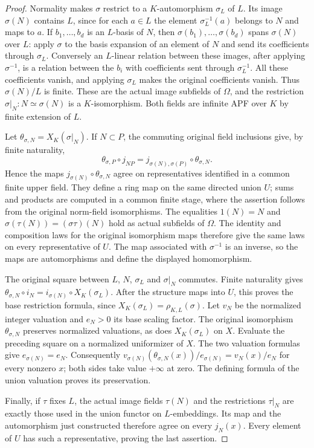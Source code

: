 \begin{proof}
Normality makes $\sigma$ restrict to a $K$-automorphism $\sigma_L$ of
$L$. Its image $\sigma(N)$ contains $L$, since for each $a\in L$
the element $\sigma_L^{-1}(a)$ belongs to $N$ and maps to $a$.
If $b_1,\ldots,b_d$ is an $L$-basis of $N$, then
$\sigma(b_1),\ldots,\sigma(b_d)$ spans $\sigma(N)$ over $L$:
apply $\sigma$ to the basis expansion of an element of $N$ and send
its coefficients through $\sigma_L$. Conversely an $L$-linear
relation between these images, after applying $\sigma^{-1}$, is a
relation between the $b_i$ with coefficients sent through
$\sigma_L^{-1}$. All these coefficients vanish, and applying
$\sigma_L$ makes the original coefficients vanish. Thus
$\sigma(N)/L$ is finite. These are the actual image subfields of
$\Omega$, and the restriction $\sigma|_N:N\simeq\sigma(N)$ is a
$K$-isomorphism. Both fields are infinite APF over $K$ by finite
extension of $L$.

Let $\theta_{\sigma,N}=X_K(\sigma|_N)$. If $N\subset P$, the
commuting original field inclusions give, by finite naturality,
\[
 \theta_{\sigma,P}\circ j_{NP}
   =j_{\sigma(N),\sigma(P)}\circ\theta_{\sigma,N}.
\]
Hence the maps $j_{\sigma(N)}\circ\theta_{\sigma,N}$ agree on
representatives identified in a common finite upper field. They
define a ring map on the same directed union $U$; sums and products
are computed in a common finite stage, where the assertion follows
from the original norm-field isomorphisms.
The equalities $1(N)=N$ and
$\sigma(\tau(N))=(\sigma\tau)(N)$ hold as actual subfields of
$\Omega$. The identity and composition laws for the original
isomorphism maps therefore give the same laws on every representative
of $U$. The map associated with $\sigma^{-1}$ is an inverse, so the
maps are automorphisms and define the displayed homomorphism.

The original square between $L$, $N$, $\sigma_L$ and $\sigma|_N$
commutes. Finite naturality gives
$\theta_{\sigma,N}\circ i_N=i_{\sigma(N)}\circ X_K(\sigma_L)$.
After the structure maps into $U$, this proves the base restriction
formula, since $X_K(\sigma_L)=\rho_{K,L}(\sigma)$.
Let $v_N$ be the normalized integer valuation and $e_N>0$ its
base scaling factor. The original isomorphism $\theta_{\sigma,N}$
preserves normalized valuations, as does $X_K(\sigma_L)$ on $X$.
Evaluate the preceding square on a normalized uniformizer of $X$.
The two valuation formulas give $e_{\sigma(N)}=e_N$. Consequently
$v_{\sigma(N)}(\theta_{\sigma,N}(x))/e_{\sigma(N)}=v_N(x)/e_N$
for every nonzero $x$; both sides take value $+\infty$ at zero.
The defining formula of the union valuation proves its preservation.

Finally, if $\tau$ fixes $L$, the actual image fields $\tau(N)$ and
the restrictions $\tau|_N$ are exactly those used in the union
functor on $L$-embeddings. Its map and the automorphism just
constructed therefore agree on every $j_N(x)$. Every element of
$U$ has such a representative, proving the last assertion.
\end{proof}

